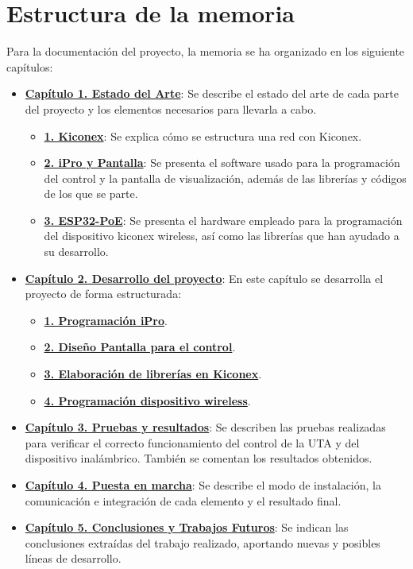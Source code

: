 \section{Estructura de la memoria}
\label{sec:estructura}

Para la documentación del proyecto, la memoria se ha organizado en los siguiente capítulos:

\begin{itemize}
	\item \textbf{\hyperref[chap:estadoArte]{Capítulo 1. Estado del Arte}}: Se describe el estado del arte de cada parte del proyecto y los elementos necesarios para llevarla a cabo.
  \begin{itemize}
    \item \textbf{\hyperref[sec:kiconex]{1. Kiconex}}: Se explica cómo se estructura una red con Kiconex.
    \item \textbf{\hyperref[sec:ipro]{2. iPro y Pantalla}}: Se presenta el software usado para la programación del control y la pantalla de visualización, además de las librerías y códigos de los que se parte.
    \item \textbf{\hyperref[sec:esp32poe]{3. ESP32-PoE}}: Se presenta el hardware empleado para la programación del dispositivo kiconex wireless, así como las librerías que han ayudado a su desarrollo.
  \end{itemize}
	\item \textbf{\hyperref[chap:desarrollo]{Capítulo 2. Desarrollo del proyecto}}: En este capítulo se desarrolla el proyecto de forma estructurada:
  \begin{itemize}
    \item \textbf{\hyperref[sec:programacionipro]{1. Programación iPro}}.
    \item \textbf{\hyperref[sec:programacionpantalla]{2. Diseño Pantalla para el control}}.
    \item \textbf{\hyperref[sec:librerias]{3. Elaboración de librerías en Kiconex}}.
    \item \textbf{\hyperref[sec:programacionesp32]{4. Programación dispositivo wireless}}.
  \end{itemize}

	\item \textbf{\hyperref[chap:resultados]{Capítulo 3. Pruebas y resultados}}: Se describen las pruebas realizadas para verificar el correcto funcionamiento del control de la UTA y del dispositivo inalámbrico. También se comentan los resultados obtenidos.
	\item \textbf{\hyperref[chap:puestaEnMarcha]{Capítulo 4. Puesta en marcha}}: Se describe el modo de instalación, la comunicación e integración de cada elemento y el resultado final.
	\item \textbf{\hyperref[chap:conclusiones]{Capítulo 5. Conclusiones y Trabajos Futuros}}: Se indican las conclusiones extraídas del trabajo realizado, aportando nuevas y posibles líneas de desarrollo.
\end{itemize}


